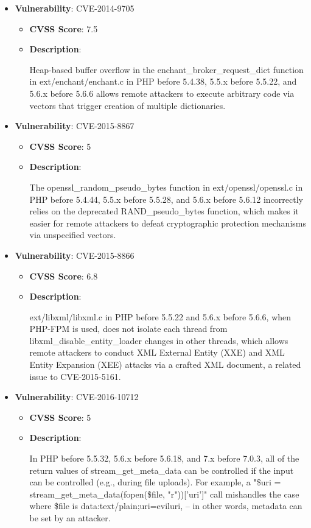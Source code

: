 \documentclass{article}
\begin{document}
\begin{itemize}
        \item \textbf{Vulnerability}: CVE-2014-9705
        \begin{itemize}
            \item \textbf{CVSS Score}:  7.5 
            \item \textbf{Description}:
            \parbox[t]{0.9\linewidth}{
                \ttfamily Heap-based buffer overflow in the enchant\_broker\_request\_dict function in ext/enchant/enchant.c in PHP before 5.4.38, 5.5.x before 5.5.22, and 5.6.x before 5.6.6 allows remote attackers to execute arbitrary code via vectors that trigger creation of multiple dictionaries.
            }
        \end{itemize}
    
        \item \textbf{Vulnerability}: CVE-2015-8867
        \begin{itemize}
            \item \textbf{CVSS Score}:  5 
            \item \textbf{Description}:
            \parbox[t]{0.9\linewidth}{
                \ttfamily The openssl\_random\_pseudo\_bytes function in ext/openssl/openssl.c in PHP before 5.4.44, 5.5.x before 5.5.28, and 5.6.x before 5.6.12 incorrectly relies on the deprecated RAND\_pseudo\_bytes function, which makes it easier for remote attackers to defeat cryptographic protection mechanisms via unspecified vectors.
            }
        \end{itemize}
    
        \item \textbf{Vulnerability}: CVE-2015-8866
        \begin{itemize}
            \item \textbf{CVSS Score}:  6.8 
            \item \textbf{Description}:
            \parbox[t]{0.9\linewidth}{
                \ttfamily ext/libxml/libxml.c in PHP before 5.5.22 and 5.6.x before 5.6.6, when PHP-FPM is used, does not isolate each thread from libxml\_disable\_entity\_loader changes in other threads, which allows remote attackers to conduct XML External Entity (XXE) and XML Entity Expansion (XEE) attacks via a crafted XML document, a related issue to CVE-2015-5161.
            }
        \end{itemize}
    
        \item \textbf{Vulnerability}: CVE-2016-10712
        \begin{itemize}
            \item \textbf{CVSS Score}:  5 
            \item \textbf{Description}:
            \parbox[t]{0.9\linewidth}{
                \ttfamily In PHP before 5.5.32, 5.6.x before 5.6.18, and 7.x before 7.0.3, all of the return values of stream\_get\_meta\_data can be controlled if the input can be controlled (e.g., during file uploads). For example, a "\$uri = stream\_get\_meta\_data(fopen(\$file, "r"))['uri']" call mishandles the case where \$file is data:text/plain;uri=eviluri, -- in other words, metadata can be set by an attacker.
            }
        \end{itemize}
    

\end{itemize}
\end{document}
